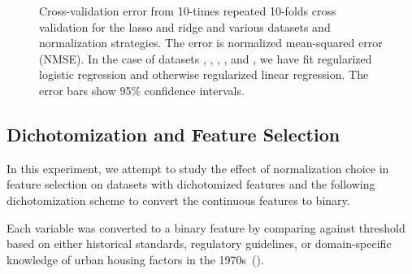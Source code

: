 \begin{figure*}[htpb]
  \centering
  \caption{%
    Cross-validation error from 10-times repeated 10-folds cross validation for the lasso and ridge
    and various datasets and normalization strategies. The error is normalized mean-squared
    error (NMSE). In the case of datasets , , , ,
    and , we have fit regularized logistic regression and
    otherwise regularized linear regression. The error bars show 95\% confidence intervals.
  }
  \label{fig:method-comparison}
\end{figure*}

\subsection{Dichotomization and Feature Selection}
\label{sec:dichotomization}

In this experiment, we attempt to study the effect of normalization choice in feature
selection on datasets with dichotomized features and the following dichotomization scheme
to convert the continuous features to binary.

Each variable was converted to a binary feature by comparing against threshold based on
either historical standards, regulatory guidelines, or domain-specific knowledge of urban
housing factors in the 1970s~().

